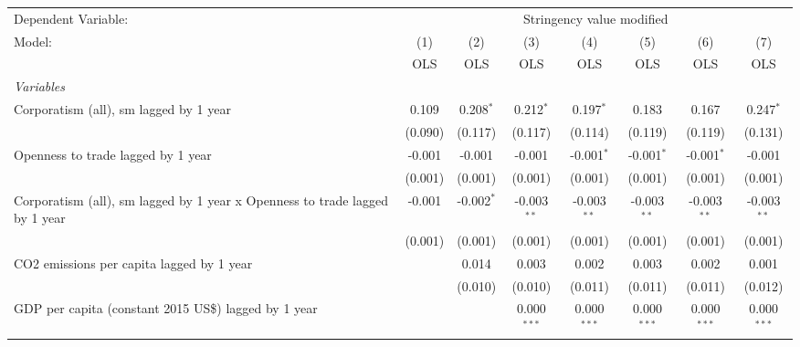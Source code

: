 
\begingroup
\centering
\begin{tabular}{lccccccc}
   \toprule
   Dependent Variable: & \multicolumn{7}{c}{Stringency value modified}\\
   Model:                                                                      & (1)     & (2)          & (3)           & (4)           & (5)           & (6)           & (7)\\  
                                                                               &  OLS    & OLS          & OLS           & OLS           & OLS           & OLS           & OLS\\  
   \midrule
   \emph{Variables}\\
   Corporatism (all), sm lagged by 1 year                                      & 0.109   & 0.208$^{*}$  & 0.212$^{*}$   & 0.197$^{*}$   & 0.183         & 0.167         & 0.247$^{*}$\\   
                                                                               & (0.090) & (0.117)      & (0.117)       & (0.114)       & (0.119)       & (0.119)       & (0.131)\\   
   Openness to trade lagged by 1 year                                          & -0.001  & -0.001       & -0.001        & -0.001$^{*}$  & -0.001$^{*}$  & -0.001$^{*}$  & -0.001\\   
                                                                               & (0.001) & (0.001)      & (0.001)       & (0.001)       & (0.001)       & (0.001)       & (0.001)\\   
   Corporatism (all), sm lagged by 1 year x Openness to trade lagged by 1 year & -0.001  & -0.002$^{*}$ & -0.003$^{**}$ & -0.003$^{**}$ & -0.003$^{**}$ & -0.003$^{**}$ & -0.003$^{**}$\\   
                                                                               & (0.001) & (0.001)      & (0.001)       & (0.001)       & (0.001)       & (0.001)       & (0.001)\\   
   CO2 emissions per capita lagged by 1 year                                   &         & 0.014        & 0.003         & 0.002         & 0.003         & 0.002         & 0.001\\   
                                                                               &         & (0.010)      & (0.010)       & (0.011)       & (0.011)       & (0.011)       & (0.012)\\   
   GDP per capita (constant 2015 US\$) lagged by 1 year                        &         &              & 0.000$^{***}$ & 0.000$^{***}$ & 0.000$^{***}$ & 0.000$^{***}$ & 0.000$^{***}$\\   

\end{tabular}
